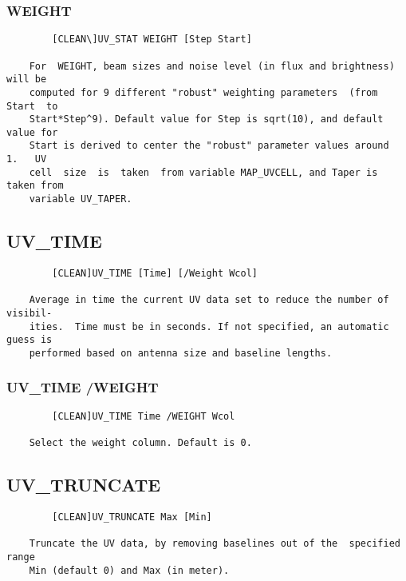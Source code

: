 \subsubsection{WEIGHT}
\begin{verbatim}
        [CLEAN\]UV_STAT WEIGHT [Step Start]

    For  WEIGHT, beam sizes and noise level (in flux and brightness) will be
    computed for 9 different "robust" weighting parameters  (from  Start  to
    Start*Step^9). Default value for Step is sqrt(10), and default value for
    Start is derived to center the "robust" parameter values around  1.   UV
    cell  size  is  taken  from variable MAP_UVCELL, and Taper is taken from
    variable UV_TAPER.

\end{verbatim}
\subsection{UV\_TIME}
\begin{verbatim}
        [CLEAN]UV_TIME [Time] [/Weight Wcol]

    Average in time the current UV data set to reduce the number of visibil-
    ities.  Time must be in seconds. If not specified, an automatic guess is
    performed based on antenna size and baseline lengths.

\end{verbatim}
\subsubsection{UV\_TIME /WEIGHT}
\begin{verbatim}
        [CLEAN]UV_TIME Time /WEIGHT Wcol

    Select the weight column. Default is 0.

\end{verbatim}
\subsection{UV\_TRUNCATE}
\begin{verbatim}
        [CLEAN]UV_TRUNCATE Max [Min]

    Truncate the UV data, by removing baselines out of the  specified  range
    Min (default 0) and Max (in meter).

\end{verbatim}
